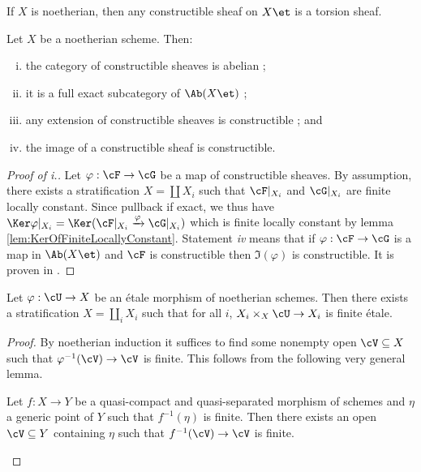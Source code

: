 \begin{remark} 
If $X$ is noetherian, then any constructible sheaf on $X\et$ is a torsion sheaf. 
\end{remark}

\begin{lem}
Let $X$ be a noetherian scheme. Then: 
\begin{enumerate}[i.]
\item 
the category of constructible sheaves is abelian ;
\item 
it is a full exact subcategory of $\Ab(X\et)$ ;
\item 
any extension of constructible sheaves is constructible ; and
\item 
the image of a constructible sheaf is constructible.
\end{enumerate}
\end{lem} 

\begin{proof}[Proof of i.]
Let $\varphi: \cF \to \cG$ be a map of constructible sheaves. By assumption, there exists a stratification $X = \coprod X_i$ such that $\cF|_{X_i}$ and $\cG|_{X_i}$ are finite locally constant. Since pullback if exact, we thus have $\Ker \varphi|_{X_i} = \Ker (\cF|_{X_i}\xrightarrow{\varphi} \cG|_{X_i})$ which is finite locally constant by lemma \ref{lem:KerOfFiniteLocallyConstant}. Statement {\it iv} means that if $\varphi :\cF\to\cG$ is a map in $\Ab(X\et)$ and $\cF$ is constructible then $\Im(\varphi)$ is constructible. It is proven in \cite{SGA4.5}.
\end{proof}

\begin{lem} \label{lem:EtaleRefinesToFiniteEtale}
Let $\varphi: \cU \to X$ be an \'etale morphism of noetherian schemes. Then there exists a stratification $X=\coprod_i X_i$ such that for all $i$, $X_i\times_X \cU \to X_i$ is finite \'etale. 
\end{lem}

\begin{proof} 
By noetherian induction it suffices to find some nonempty open $\cV\subseteq X$ such that $\varphi^{-1}(\cV)\to \cV$ is finite. This follows from the following very general lemma.
\begin{lem}
Let $f: X\to Y$ be a quasi-compact and quasi-separated morphism of schemes and $\eta$ a generic point of $Y$ such that $f^{-1}(\eta)$ is finite. Then there exists an open $\cV \subseteq Y$ containing $\eta$ such that $f^{-1}(\cV)\to \cV$ is finite.
\end{lem}
\end{proof}

